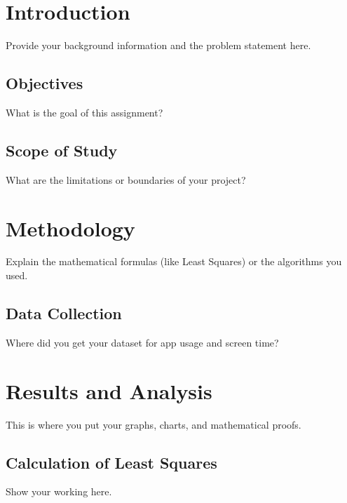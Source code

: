 \documentclass[12pt, a4paper]{article}
\begin{document}
 


\newpage




\newpage

\setcounter{page}{2}

\tableofcontents
\newpage

\listoffigures
\listoftables
\newpage


\section{Introduction}
Provide your background information and the problem statement here.

\subsection{Objectives}
What is the goal of this assignment?

\subsection{Scope of Study}
What are the limitations or boundaries of your project?

\section{Methodology}
Explain the mathematical formulas (like Least Squares) or the algorithms you used.

\subsection{Data Collection}
Where did you get your dataset for app usage and screen time?

\section{Results and Analysis}
This is where you put your graphs, charts, and mathematical proofs.

\subsection{Calculation of Least Squares}
Show your working here.
\end{document}
